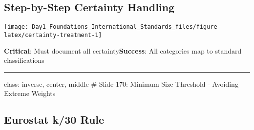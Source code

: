 \documentclass[
]{article}
\newenvironment{Shaded}{\begin{snugshade}}{\end{snugshade}}
\newcommand{\AttributeTok}[1]{\textcolor[rgb]{0.13,0.29,0.53}{#1}}
\newcommand{\CommentTok}[1]{\textcolor[rgb]{0.56,0.35,0.01}{\textit{#1}}}
\newcommand{\DecValTok}[1]{\textcolor[rgb]{0.00,0.00,0.81}{#1}}
\newcommand{\FunctionTok}[1]{\textcolor[rgb]{0.13,0.29,0.53}{\textbf{#1}}}
\newcommand{\NormalTok}[1]{#1}
\newcommand{\OtherTok}[1]{\textcolor[rgb]{0.56,0.35,0.01}{#1}}
\newcommand{\SpecialCharTok}[1]{\textcolor[rgb]{0.81,0.36,0.00}{\textbf{#1}}}
\newcommand{\StringTok}[1]{\textcolor[rgb]{0.31,0.60,0.02}{#1}}
\begin{document}
\subsection{Step-by-Step Certainty
Handling}\label{step-by-step-certainty-handling}

\texttt{[image: Day1\_Foundations\_International\_Standards\_files/figure-latex/certainty-treatment-1]}

\textbf{Critical}: Must document all certainty\textbf{Success}: All
categories map to standard classifications

\begin{center}\rule{0.5\linewidth}{0.5pt}\end{center}

class: inverse, center, middle \# Slide 170: Minimum Size Threshold -
Avoiding Extreme Weights

\subsection{Eurostat k/30 Rule}\label{eurostat-k30-rule}

\begin{Shaded}
\end{Shaded}
\end{document}
